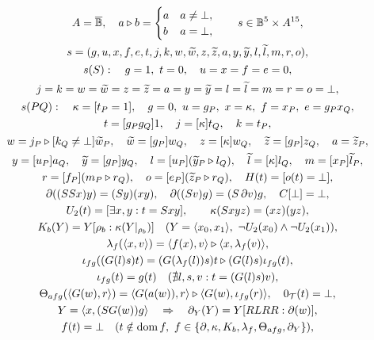 \begin{gather}
A=\overline{\mathbb B},\quad
a\triangleright b=\begin{cases}a&a\ne\bot,\\b&a=\bot,\end{cases}\qquad
s\in \mathbb B^5\times A^{15},\\
s=(g,u,x,f,e,t,j,k,w,\widetilde w,z,\widetilde z,a,y,\widetilde y,l,\widetilde l,m,r,o),\\
\begin{gathered}
s(S):\quad g=1,\ t=0,\quad u=x=f=e=0,\\
j=k=w=\widetilde w=z=\widetilde z=a=y=\widetilde y=l=\widetilde l=m=r=o=\bot,
\end{gathered}\\
\begin{gathered}
s(PQ):\quad \kappa=[t_P=1],\quad g=0,\ u=g_P,\ x=\kappa,\ f=x_P,\ e=g_Px_Q,\\
t=[g_Pg_Q]1,\quad j=[\kappa]t_Q,\quad k=t_P,
\end{gathered}\\
w=j_P\triangleright [k_Q\ne\bot]\widetilde w_P,\quad
\widetilde w=[g_P]w_Q,\quad z=[\kappa]w_Q,\quad\widetilde z=[g_P]z_Q,\quad a=\widetilde z_P,\\
y=[u_P]a_Q,\quad\widetilde y=[g_P]y_Q,\quad
l=[u_P](\widetilde y_P\triangleright l_Q),\quad\widetilde l=[\kappa]l_Q,\quad m=[x_P]\widetilde l_P,\\
r=[f_P](m_P\triangleright r_Q),\quad o=[e_P](\widetilde z_P\triangleright r_Q),
\quad H(t)=[o(t)=\bot],\\
\partial((SSx)y)=(Sy)(xy),\quad \partial((Sv)g)=(S\,\partial v)g,\quad C[\bot]=\bot,\\
U_2(t)=[\exists x,y:t=Sxy],\qquad \kappa(Sxyz)=(xz)(yz),\\
K_b(Y)=Y[\rho_b:\kappa(Y|_{\rho_b})]\quad
(Y=\pair{x_0}{x_1},\ \neg U_2(x_0)\land\neg U_2(x_1)),\\
\lambda_f(\pair{x}{v})=\pair{f(x)}v\triangleright\pair x{\lambda_f(v)},\\
\iota_{fg}((G(l)s)t)=(G(\lambda_f(l))s)t\triangleright(G(l)s)\iota_{fg}(t),\\
\iota_{fg}(t)=g(t)\quad(\nexists l,s,v:t=(G(l)s)v),\\
\Theta_{afg}(\pair{G(w)}r)=
\pair{G(a(w))}r\triangleright\pair{G(w)}{\iota_{fg}(r)},\quad 0_\T(t)=\bot,\\
Y=\pair{x}{(S G(w))g}\quad\Rightarrow\quad \partial_Y(Y)=Y[RLRR:\partial(w)],\\
f(t)=\bot\quad(t\notin {\rm dom}\,f,\ f\in\{\partial,\kappa,K_b,\lambda_f,\Theta_{afg},\partial_Y\}),\\

\end{gather}

